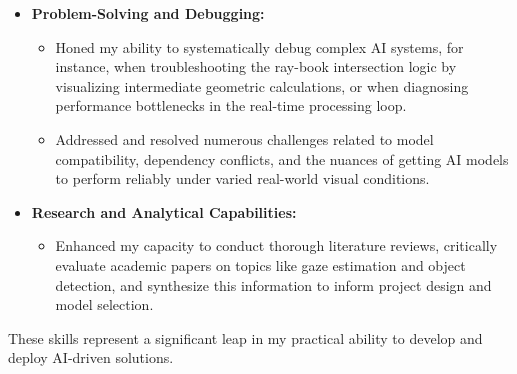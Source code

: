 \begin{itemize}
\begin{itemize}
    \end{itemize}
    \item \textbf{Problem-Solving and Debugging:}
    \begin{itemize}
        \item Honed my ability to systematically debug complex AI systems, for instance, when troubleshooting the ray-book intersection logic by visualizing intermediate geometric calculations, or when diagnosing performance bottlenecks in the real-time processing loop.
        \item Addressed and resolved numerous challenges related to model compatibility, dependency conflicts, and the nuances of getting AI models to perform reliably under varied real-world visual conditions.
    \end{itemize}
    \item \textbf{Research and Analytical Capabilities:}
    \begin{itemize}
        \item Enhanced my capacity to conduct thorough literature reviews, critically evaluate academic papers on topics like gaze estimation and object detection, and synthesize this information to inform project design and model selection.
    \end{itemize}
\end{itemize}
These skills represent a significant leap in my practical ability to develop and deploy AI-driven solutions.

